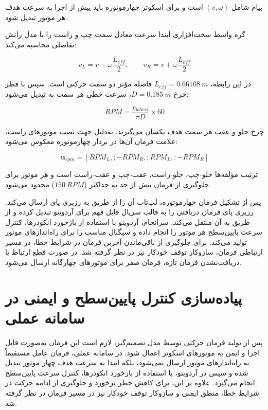 پیام  شامل $(v,\omega)$ است و برای اسکوتر چهارموتوره باید پیش از اجرا به سرعت هدف هر موتور تبدیل شود.

گره واسط سخت‌افزاری ابتدا سرعت معادل سمت چپ و راست را با مدل رانش تفاضلی محاسبه می‌کند:

\begin{equation}
	v_L = v - \omega \frac{L_{eff}}{2},
	\qquad
	v_R = v + \omega \frac{L_{eff}}{2}
	\label{eq:real_left_and_right_side_velocity}
\end{equation}

در این رابطه، $L_{eff}=0.66108~m$ فاصله مؤثر دو سمت حرکتی است. سپس با قطر چرخ $D=0.185~m$، سرعت خطی هر سمت به  تبدیل می‌شود:

\begin{equation}
	RPM = \frac{v_{wheel}}{\pi D} \times 60
	\label{eq:real_wheel_speed_to_rpm}
\end{equation}

چرخ جلو و عقب هر سمت هدف یکسان می‌گیرند. به‌دلیل جهت نصب موتورهای راست، علامت فرمان آن‌ها در بردار چهارموتوره معکوس می‌شود:

\begin{equation}
	\mathbf{u}_{rpm} =
	[
	RPM_L,;
	-RPM_R,;
	RPM_L,;
	-RPM_R
	]
	\label{eq:real_four_motor_rpm_command}
\end{equation}

ترتیب مؤلفه‌ها جلو-چپ، جلو-راست، عقب-چپ و عقب-راست است و  هر موتور برای جلوگیری از فرمان بیش از حد به حداکثر ($150~RPM$) محدود می‌شود.

پس از تشکیل فرمان چهارموتوره، لپ‌تاپ آن را از طریق  به رزبری پای ارسال می‌کند. رزبری پای فرمان دریافتی را به قالب سریال قابل فهم برای آردوینو تبدیل کرده و از طریق  به آن منتقل می‌کند. سرانجام، آردوینو با استفاده از بازخورد انکودرها، کنترل سرعت پایین‌سطح هر موتور را انجام داده و سیگنال  مناسب را برای راه‌اندازهای موتور تولید می‌کند. برای جلوگیری از باقی‌ماندن آخرین فرمان در شرایط خطا، در مسیر ارتباطی فرمان، سازوکار توقف خودکار نیز در نظر گرفته شد. در صورت قطع ارتباط یا دریافت‌نشدن فرمان تازه، فرمان صفر برای موتورهای چهارگانه ارسال می‌شود.
\section{پیاده‌سازی کنترل پایین‌سطح و ایمنی در سامانه عملی}
\label{sec:real_low_level_control_and_safety}

پس از تولید فرمان حرکتی توسط مدل تصمیم‌گیر، لازم است این فرمان به‌صورت قابل اجرا و ایمن به موتورهای اسکوتر اعمال شود. در سامانه عملی، فرمان عامل مستقیماً به راه‌اندازهای موتور ارسال نمی‌شود، بلکه ابتدا به سرعت هدف چهار موتور تبدیل شده و سپس در آردوینو، با استفاده از بازخورد انکودرها، کنترل سرعت پایین‌سطح انجام می‌گیرد. علاوه بر این، برای کاهش خطر برخورد و جلوگیری از ادامه حرکت در شرایط خطا، منطق ایمنی و سازوکار توقف خودکار نیز در مسیر فرمان در نظر گرفته شد.

